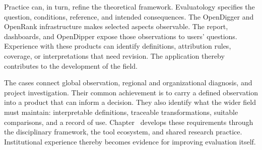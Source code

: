 Practice can, in turn, refine the theoretical framework. Evaluatology specifies the question, conditions, reference, and intended consequences. The OpenDigger and OpenRank infrastructure makes selected aspects observable. The report, dashboards, and OpenDipper expose those observations to users' questions. Experience with these products can identify definitions, attribution rules, coverage, or interpretations that need revision. The application thereby contributes to the development of the field.

The cases connect global observation, regional and organizational diagnosis, and project investigation. Their common achievement is to carry a defined observation into a product that can inform a decision. They also identify what the wider field must maintain: interpretable definitions, traceable transformations, suitable comparisons, and a record of use. Chapter~ develops these requirements through the disciplinary framework, the tool ecosystem, and shared research practice. Institutional experience thereby becomes evidence for improving evaluation itself.
